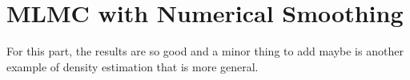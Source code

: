 \documentclass[11pt]{article}
\begin{document}
 \section{MLMC with Numerical Smoothing}\label{sec:MLMC with Numerical Smoothing}

For this part, the results are so good and a minor thing to add maybe is another example of density estimation that is more general.



%
% 







 

 

 
 
 
\end{document}
